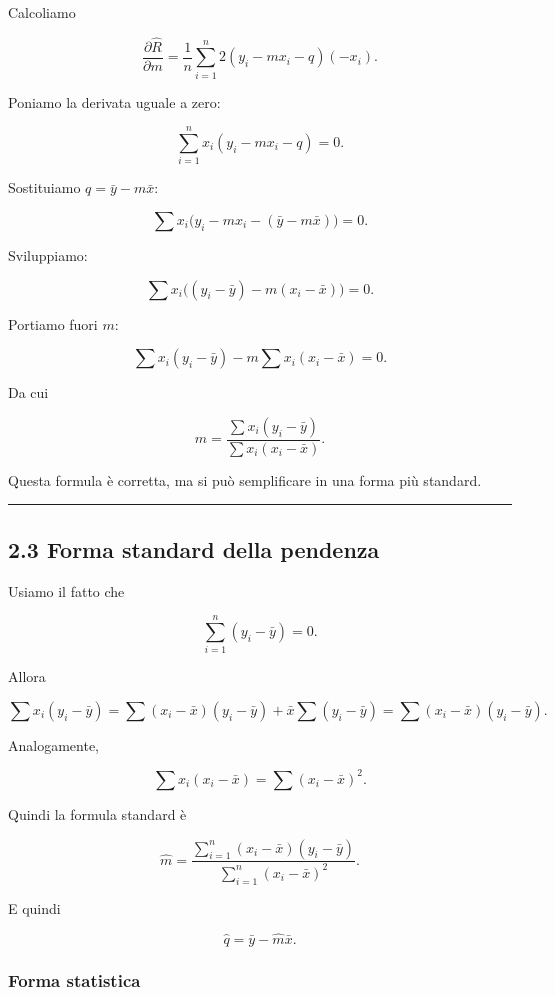 \documentclass{article}
\begin{document}
Calcoliamo

\[
\frac{\partial \hat R}{\partial m}
=
\frac{1}{n}\sum_{i=1}^n 2(y_i-mx_i-q)(-x_i).
\]

Poniamo la derivata uguale a zero:

\[
\sum_{i=1}^n x_i(y_i-mx_i-q)=0.
\]

Sostituiamo \(q=\bar y - m\bar x\):

\[
\sum x_i\big(y_i-mx_i-(\bar y-m\bar x)\big)=0.
\]

Sviluppiamo:

\[
\sum x_i\big((y_i-\bar y)-m(x_i-\bar x)\big)=0.
\]

Portiamo fuori \(m\):

\[
\sum x_i(y_i-\bar y)-m\sum x_i(x_i-\bar x)=0.
\]

Da cui

\[
m=\frac{\sum x_i(y_i-\bar y)}{\sum x_i(x_i-\bar x)}.
\]

Questa formula è corretta, ma si può semplificare in una forma più
standard.

\begin{center}\rule{0.5\linewidth}{0.5pt}\end{center}

\subsection{2.3 Forma standard della
pendenza}\label{forma-standard-della-pendenza}

Usiamo il fatto che

\[
\sum_{i=1}^n (y_i-\bar y)=0.
\]

Allora

\[
\sum x_i(y_i-\bar y)
=
\sum (x_i-\bar x)(y_i-\bar y)
+
\bar x \sum (y_i-\bar y)
=
\sum (x_i-\bar x)(y_i-\bar y).
\]

Analogamente,

\[
\sum x_i(x_i-\bar x)
=
\sum (x_i-\bar x)^2.
\]

Quindi la formula standard è

\[
\hat m
=
\frac{\sum_{i=1}^n (x_i-\bar x)(y_i-\bar y)}
{\sum_{i=1}^n (x_i-\bar x)^2}.
\]

E quindi

\[
\hat q = \bar y - \hat m \bar x.
\]

\subsubsection{Forma statistica}\label{forma-statistica}
\end{document}
